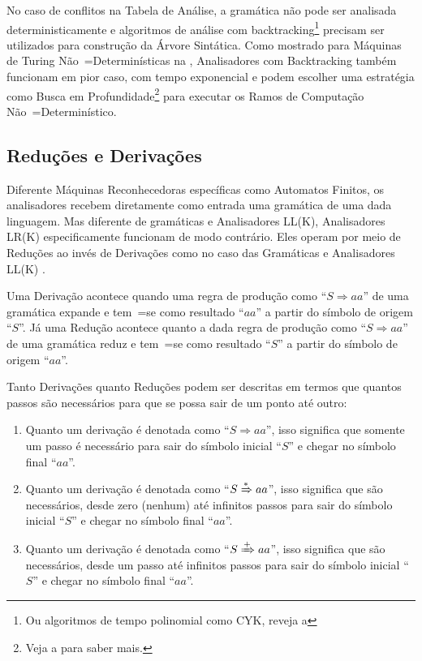     No caso de conflitos na Tabela de Análise,
    a gramática não pode ser analisada deterministicamente e
    algoritmos de análise com backtracking\footnote{
    Ou algoritmos de tempo polinomial como CYK,
    reveja a 
    }
    precisam ser utilizados para construção da Árvore Sintática.
    Como mostrado para Máquinas de Turing Não~=Determinísticas na ,
    Analisadores com Backtracking também funcionam em pior caso,
    com tempo exponencial e
    podem escolher uma estratégia como Busca em Profundidade\footnote{
    Veja a  para saber mais.
    } para executar os Ramos de Computação Não~=Determinístico.


\subsection{Reduções e Derivações}
\label{reducoesEderivacoes}

    Diferente Máquinas Reconhecedoras específicas como Automatos Finitos,
    os analisadores recebem diretamente como entrada uma gramática de uma dada linguagem.
    Mas diferente de gramáticas e
    Analisadores LL(K),
    Analisadores LR(K) especificamente funcionam de modo contrário.
    Eles operam por meio de Reduções ao invés de Derivações como no caso das Gramáticas e
    Analisadores LL(K) \cite{ahoCompilerDragonBook}.

    Uma Derivação acontece quando uma regra de produção como ``$S \Rightarrow a a $'' de uma gramática expande e
    tem~=se como resultado ``$a a$'' a partir do símbolo de origem ``$S$''.
    Já uma Redução acontece quanto a dada regra de produção como ``$S \Rightarrow a a $'' de uma gramática reduz e
    tem~=se como resultado ``$S$'' a partir do símbolo de origem ``$a a$''.

    Tanto Derivações quanto Reduções podem ser descritas em termos que quantos passos são necessários para que se possa sair de um ponto até outro:
    \begin{enumerate}%
        \item Quanto um derivação é denotada como ``$S \Rightarrow a a $'',
        isso significa que somente um passo é necessário para sair do símbolo inicial ``$S$'' e
        chegar no símbolo final ``$a a$''.
        \item Quanto um derivação é denotada como ``$S \xRightarrow{*} a a $'',
        isso significa que são necessários,
        desde zero (nenhum) até infinitos passos para sair do símbolo inicial ``$S$'' e
        chegar no símbolo final ``$a a$''.
        \item Quanto um derivação é denotada como ``$S \xRightarrow{+} a a $'',
        isso significa que são necessários,
        desde um passo até infinitos passos para sair do símbolo inicial ``$S$'' e
        chegar no símbolo final ``$a a$''.
    \end{enumerate}

